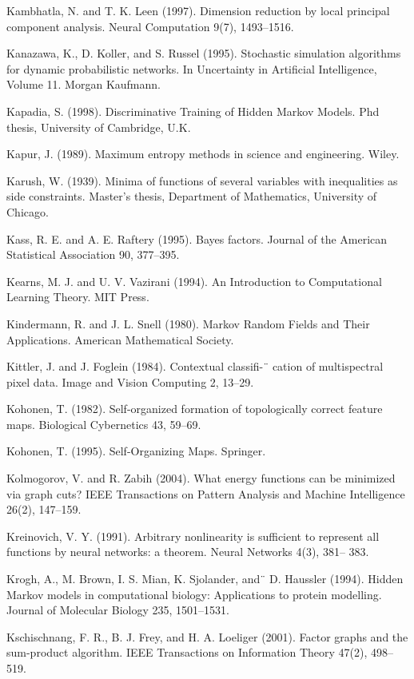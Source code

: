 \documentclass[
  10
]{article}
\begin{document}
Kambhatla, N. and T. K. Leen (1997). Dimension reduction by local
principal component analysis. Neural Computation 9(7), 1493--1516.

Kanazawa, K., D. Koller, and S. Russel (1995). Stochastic simulation
algorithms for dynamic probabilistic networks. In Uncertainty in
Artificial Intelligence, Volume 11. Morgan Kaufmann.

Kapadia, S. (1998). Discriminative Training of Hidden Markov Models. Phd
thesis, University of Cambridge, U.K.

Kapur, J. (1989). Maximum entropy methods in science and engineering.
Wiley.

Karush, W. (1939). Minima of functions of several variables with
inequalities as side constraints. Master's thesis, Department of
Mathematics, University of Chicago.

Kass, R. E. and A. E. Raftery (1995). Bayes factors. Journal of the
American Statistical Association 90, 377--395.

Kearns, M. J. and U. V. Vazirani (1994). An Introduction to
Computational Learning Theory. MIT Press.

Kindermann, R. and J. L. Snell (1980). Markov Random Fields and Their
Applications. American Mathematical Society.

Kittler, J. and J. Foglein (1984). Contextual classifi-¨ cation of
multispectral pixel data. Image and Vision Computing 2, 13--29.

Kohonen, T. (1982). Self-organized formation of topologically correct
feature maps. Biological Cybernetics 43, 59--69.

Kohonen, T. (1995). Self-Organizing Maps. Springer.

Kolmogorov, V. and R. Zabih (2004). What energy functions can be
minimized via graph cuts? IEEE Transactions on Pattern Analysis and
Machine Intelligence 26(2), 147--159.

Kreinovich, V. Y. (1991). Arbitrary nonlinearity is sufficient to
represent all functions by neural networks: a theorem. Neural Networks
4(3), 381-- 383.

Krogh, A., M. Brown, I. S. Mian, K. Sjolander, and¨ D. Haussler (1994).
Hidden Markov models in computational biology: Applications to protein
modelling. Journal of Molecular Biology 235, 1501--1531.

Kschischnang, F. R., B. J. Frey, and H. A. Loeliger (2001). Factor
graphs and the sum-product algorithm. IEEE Transactions on Information
Theory 47(2), 498--519.
\end{document}
